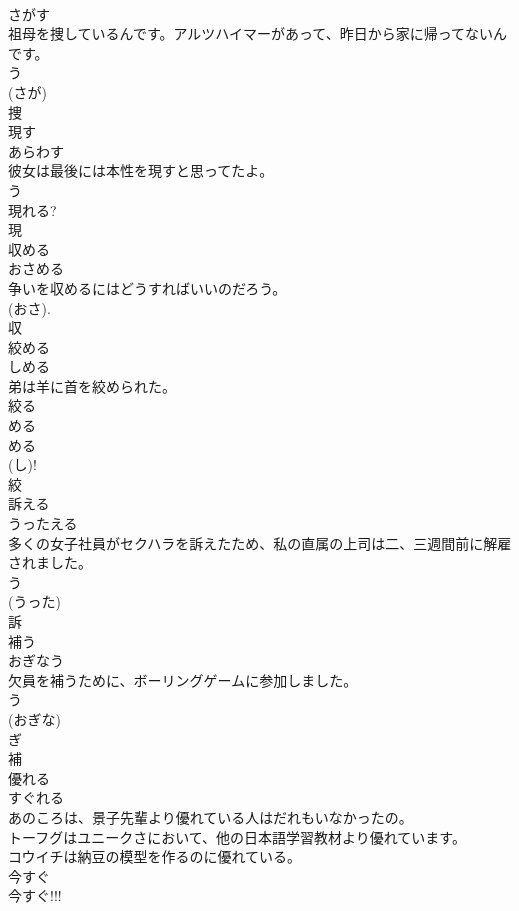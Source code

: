 \documentclass[8pt]{extreport}
\begin{document}
\begin{CJK}{UTF8}{min}
\\	さがす	
\\	祖母を捜しているんです。アルツハイマーがあって、昨日から家に帰ってないんです。	
\\	う 
\\	(さが) 
\\	捜	
\\	現す	
\\	あらわす	
\\	彼女は最後には本性を現すと思ってたよ。	
\\	う 
\\	現れる? 
\\	現	
\\	収める	
\\	おさめる	
\\	争いを収めるにはどうすればいいのだろう。	
\\	(おさ). 
\\	収	
\\	絞める	
\\	しめる	
\\	弟は羊に首を絞められた。	
\\	絞る 
\\	める 
\\	める 
\\	(し)! 
\\	絞	
\\	訴える	
\\	うったえる	
\\	多くの女子社員がセクハラを訴えたため、私の直属の上司は二、三週間前に解雇されました。	
\\	う 
\\	(うった) 
\\	訴	
\\	補う	
\\	おぎなう	
\\	欠員を補うために、ボーリングゲームに参加しました。	
\\	う 
\\	(おぎな) 
\\	ぎ 
\\	補	
\\	優れる	
\\	すぐれる	
\\	あのころは、景子先輩より優れている人はだれもいなかったの。	
\\	トーフグはユニークさにおいて、他の日本語学習教材より優れています。	
\\	コウイチは納豆の模型を作るのに優れている。	
\\	今すぐ 
\\	今すぐ!!!

\end{CJK}
\end{document}
